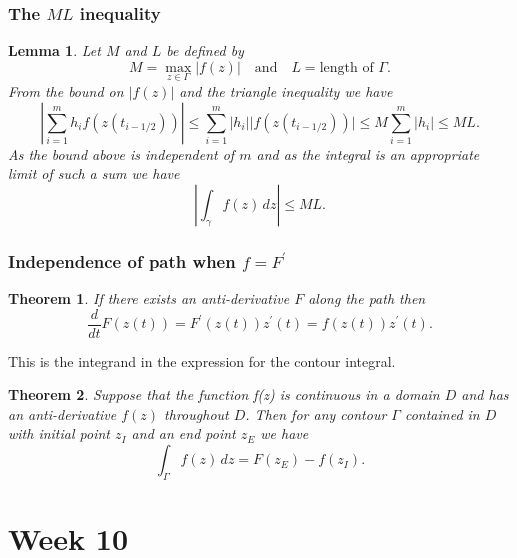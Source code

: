 \documentclass{article}
\newtheorem{theorem}{Theorem}
\newtheorem{lemma}{Lemma}
\begin{document}
\subsubsection{The $ML$ inequality}
\begin{lemma}
    Let $M$ and $L$ be defined by
    \begin{equation}
        M = \max_{z\in\Gamma}\vert f(z)\vert\quad \text{and} \quad L=\text{length of }\Gamma.
    \end{equation}
    From the bound on $\vert f(z)\vert$ and the triangle inequality we have
    \begin{equation}
        \left\vert \sum_{i=1}^m h_i f(z(t_{i-1/2})) \right\vert \leq \sum_{i=1}^m \vert h_i\vert \vert f(z(t_{i-1/2}))\vert \leq M\sum_{i=1}^m\vert h_i\vert\leq ML. \nonumber
    \end{equation}
    As the bound above is independent of $m$ and as the integral is an appropriate limit of such a sum we have
    \begin{equation}
        \left\vert \int_\gamma f(z)\,dz \right\vert \leq ML.
    \end{equation}
\end{lemma}

\subsubsection{Independence of path when $f = F^\prime$}
\begin{theorem}
    If there exists an anti-derivative $F$ along the path then
    \begin{equation}
        \frac{d}{dt}F(z(t)) = F^\prime (z(t))z^\prime(t) = f(z(t))z^\prime(t).
    \end{equation}
\end{theorem}
This is the integrand in the expression for the contour integral.
\begin{theorem}
    Suppose that the function f(z) is continuous in a domain $D$ and has an anti-derivative $f(z)$ throughout $D$. Then for any contour $\Gamma$ contained in $D$ with initial point $z_I$ and an end point $z_E$ we have
    \begin{equation}
        \int_\Gamma f(z)\,dz = F(z_E)-f(z_I).
    \end{equation}
\end{theorem}


\section{Week 10}
\end{document}
